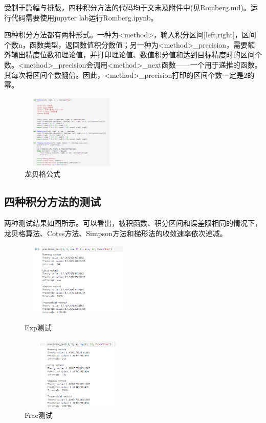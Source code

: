 \documentclass{article}
\begin{document}
受制于篇幅与排版，四种积分方法的代码均于文末及附件中(见Romberg.md)。运行代码需要使用jupyter lab运行Romberg.ipynb。

四种积分方法都有两种形式。一种为<method>，输入积分区间[left,right]，区间个数n，函数类型，返回数值积分数值；另一种为<method>\_precision，需要额外输出精度位数和理论值，并打印理论值、数值积分值和达到目标精度时的区间个数。<method>\_precision会调用<method>\_next函数——一个用于递推的函数。其每次将区间个数翻倍。因此，<method>\_precision打印的区间个数一定是2的幂。
\begin{figure}[htbp]
	\centering
	\includegraphics[width=4.8cm, height=3.6cm]{龙贝格1.png}
	\caption{龙贝格公式}
\end{figure}

	\subsection{四种积分方法的测试}

两种测试结果如图所示。可以看出，被积函数、积分区间和误差限相同的情况下，龙贝格算法、Cotes方法、Simpson方法和梯形法的收敛速率依次递减。

\begin{figure}[h]
\begin{minipage}[t]{0.45\linewidth}
\centering
\includegraphics[width=5.5cm,height=3.5cm]{测试图1.png}
\caption{Exp测试}
\end{minipage}
\begin{minipage}[t]{0.45\linewidth}        %
\hspace{2mm}
\includegraphics[width=5.5cm,height=3.5cm]{测试图2.png}
\caption{Frac测试}
\end{minipage}
\end{figure}
\end{document}
